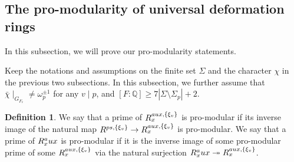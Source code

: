 \documentclass[12pt]{amsart}
\theoremstyle{plain}
\newtheorem{cor}[thm]{Corollary}
\theoremstyle{definition}
\newtheorem{defn}[thm]{Definition}
\theoremstyle{remark}
\begin{document}

	



\subsection{The pro-modularity of universal deformation rings}
In  this subsection, we will prove our pro-modularity statements.

Keep the notations and assumptions on the finite set $\Sigma$ and the character $\chi$ in the previous two subsections. In this subsection, we further assume that $\bar{\chi}\mid_{G_{F_v}} \ne \omega_p^{\pm 1}$ for any $v\mid p$, and $[F:\mathbb{Q}] \ge 7|\Sigma \setminus \Sigma_p|+2.$

\begin{defn}\label{pro-modular}
	We say that a prime of $ R_x^{\textnormal{aux}, \{\xi_v\}}$ is pro-modular if its inverse image of the natural map $ R^{\textnormal{ps}, \{\xi_v\}} \to R_x^{\textnormal{aux}, \{\xi_v\}}$ is pro-modular. We say that a prime of $ R_x^\textnormal{aux}$ is pro-modular if it is the inverse image of some pro-modular prime of some $ R_x^{\textnormal{aux}, \{\xi_v\}}$ via the natural surjection $ R_x^\textnormal{aux} \twoheadrightarrow R_x^{\textnormal{aux}, \{\xi_v\}}$. 
\end{defn}
\end{document}
